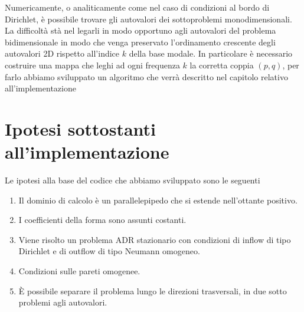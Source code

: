 Numericamente, o analiticamente come nel caso di condizioni al bordo di Dirichlet, \`e possibile
trovare gli autovalori dei sottoproblemi monodimensionali. La difficolt\`a
st\`a nel legarli in modo opportuno agli autovalori del problema bidimensionale in modo che 
venga preservato l'ordinamento crescente degli autovalori 2D rispetto all'indice $k$ della base modale.
In particolare \`e necessario costruire una mappa che leghi ad ogni frequenza $k$ 
la corretta coppia $(p,q)$, per farlo abbiamo sviluppato un algoritmo che verr\`a descritto 
nel capitolo relativo all'implementazione
\clearpage

\section{Ipotesi sottostanti all'implementazione}
\label{sec: ipotesi}

Le ipotesi alla base del codice che abbiamo sviluppato sono le seguenti
\begin{enumerate}[label=\Roman{*} -, ref=(\Roman{*})]
\item Il dominio di calcolo \`e un parallelepipedo che si estende nell'ottante positivo.
\item I coefficienti della forma sono assunti costanti.
\item Viene risolto un problema ADR stazionario con condizioni di inflow di tipo Dirichlet e di outflow di tipo Neumann omogeneo.
\item Condizioni sulle pareti omogenee.
\item \`E possibile separare il problema lungo le direzioni trasversali, in due sotto problemi agli autovalori.
\end{enumerate}

